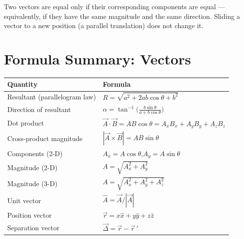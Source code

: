 \begin{keybox}
Two vectors are equal only if their corresponding components are equal --- equivalently,
if they have the same magnitude and the same direction. Sliding a vector to a new position
(a parallel translation) does not change it.
\end{keybox}


\section*{Formula Summary: Vectors}

\begin{formulabox}
\begin{tabular}{ll}
  \toprule
  \textbf{Quantity} & \textbf{Formula} \\
  \midrule
  Resultant (parallelogram law) & $R=\sqrt{a^2+2ab\cos\theta+b^2}$ \\[4pt]
  Direction of resultant & $\alpha=\tan^{-1}\!\bigl(\tfrac{b\sin\theta}{a+b\cos\theta}\bigr)$ \\[4pt]
  Dot product & $\vec{A}\cdot\vec{B}=AB\cos\theta=A_xB_x+A_yB_y+A_zB_z$ \\[4pt]
  Cross-product magnitude & $|\vec{A}\times\vec{B}|=AB\sin\theta$ \\[4pt]
  Components (2-D) & $A_x=A\cos\theta$,\quad $A_y=A\sin\theta$ \\[4pt]
  Magnitude (2-D) & $A=\sqrt{A_x^2+A_y^2}$ \\[4pt]
  Magnitude (3-D) & $A=\sqrt{A_x^2+A_y^2+A_z^2}$ \\[4pt]
  Unit vector & $\hat{A}=\vec{A}/|\vec{A}|$ \\[4pt]
  Position vector & $\vec{r}=x\hat{x}+y\hat{y}+z\hat{z}$ \\[4pt]
  Separation vector & $\vec{\Delta}=\vec{r}-\vec{r}\,'$ \\
  \bottomrule
\end{tabular}
\end{formulabox}
